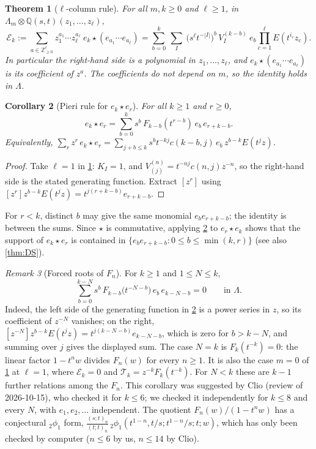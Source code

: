 \documentclass[11pt]{amsart}
\newtheorem{theorem}{Theorem}[section]
\newtheorem{corollary}[theorem]{Corollary}
\theoremstyle{definition}
\theoremstyle{remark}
\newtheorem{remark}[theorem]{Remark}
\numberwithin{equation}{section}
\newcommand{\Lam}{\Lambda}
\begin{document}
\begin{theorem}[$\ell$-column rule]\label{thm:ellcol}
For all $m,k\ge0$ and $\ell\ge1$, in $\Lam_m\otimes\mathbb{Q}(s,t)(z_1,\dots,z_\ell)$,
\[ \mathcal E_k:=\sum_{a\in\mathbb{Z}_{\ge0}^\ell}z_1^{a_1}\cdots z_\ell^{a_\ell}\ e_k\star(e_{a_1}\cdots e_{a_\ell})=\sum_{b=0}^{k}\ \sum_{I}\ \bigl(s^\ell t^{-|I|}\bigr)^b\,V^{(k-b)}_I\ e_b\prod_{c=1}^\ell E(t^{i_c}z_c). \]
In particular the right-hand side is a polynomial in $z_1,\dots,z_\ell$, and $e_k\star(e_{a_1}\cdots e_{a_\ell})$ is its coefficient of $z^a$. The coefficients do not depend on $m$, so the identity holds in $\Lam$.
\end{theorem}

\begin{corollary}[Pieri rule for $e_k\star e_r$]\label{cor:pieri-ekr}
For all $k\ge1$ and $r\ge0$,
\[ e_k\star e_r=\sum_{b=0}^{k}s^b\,F_{k-b}(t^{r-b})\,e_b\,e_{r+k-b}. \]
Equivalently, $\sum_rz^r\,e_k\star e_r=\sum_{j+b\le k}s^bt^{-kj}c(k-b,j)\,e_b\,z^{b-k}E(t^jz)$.
\end{corollary}
\begin{proof}
Take $\ell=1$ in \cref{thm:ellcol}: $K_I=1$, and $V^{(n)}_{(j)}=t^{-nj}c(n,j)z^{-n}$, so the right-hand side is the stated generating function. Extract $[z^r]$ using $[z^r]z^{b-k}E(t^jz)=t^{j(r+k-b)}e_{r+k-b}$.
\end{proof}
For $r<k$, distinct $b$ may give the same monomial $e_be_{r+k-b}$; the identity is between the sums. Since $\star$ is commutative, applying \cref{cor:pieri-ekr} to $e_r\star e_k$ shows that the support of $e_k\star e_r$ is contained in $\{e_be_{r+k-b}:0\le b\le\min(k,r)\}$ (see also \cref{thm:DS}).

\begin{remark}[Forced roots of $F_n$]\label{rem:forced}
For $k\ge1$ and $1\le N\le k$,
\[ \sum_{b=0}^{k-N}s^b\,F_{k-b}\bigl(t^{-N-b}\bigr)\,e_b\,e_{k-N-b}=0\qquad\text{in }\Lam . \]
Indeed, the left side of the generating function in \cref{cor:pieri-ekr} is a power series in $z$, so its coefficient of $z^{-N}$ vanishes; on the right, $[z^{-N}]z^{b-k}E(t^jz)=t^{j(k-N-b)}e_{k-N-b}$, which is zero for $b>k-N$, and summing over $j$ gives the displayed sum. The case $N=k$ is $F_k(t^{-k})=0$: the linear factor $1-t^nw$ divides $F_n(w)$ for every $n\ge1$. It is also the case $m=0$ of \cref{thm:ellcol} at $\ell=1$, where $\mathcal E_k=0$ and $\mathcal T_k=z^{-k}F_k(t^{-k})$. For $N<k$ these are $k-1$ further relations among the $F_n$. This corollary was suggested by Clio (review of 2026-10-15), who checked it for $k\le6$; we checked it independently for $k\le8$ and every $N$, with $e_1,e_2,\dots$ independent. The quotient $F_n(w)/(1-t^nw)$ has a conjectural ${}_2\phi_1$ form, $\frac{(s;t)_n}{(t;t)_n}\,{}_2\phi_1(t^{1-n},t/s;t^{1-n}/s;t;w)$, which has only been checked by computer ($n\le6$ by us, $n\le14$ by Clio).
\end{remark}
\end{document}
